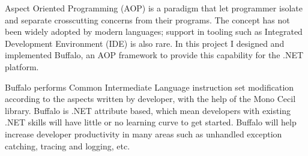 \begin{abstractpage}
Aspect Oriented Programming (AOP) is a paradigm that let programmer isolate and separate crosscutting concerns from their programs. The concept has not been widely adopted by modern languages; support in tooling such as Integrated Development Environment (IDE) is also rare. In this project I designed and implemented Buffalo, an AOP framework to provide this capability for the .NET platform.

Buffalo performs Common Intermediate Language instruction set modification according to the aspects written by developer, with the help of the Mono Cecil library. Buffalo is .NET attribute based, which mean developers with existing .NET skills will have little or no learning curve to get started. Buffalo will help increase developer productivity in many areas such as unhandled exception catching, tracing and logging, etc.
\end{abstractpage}
